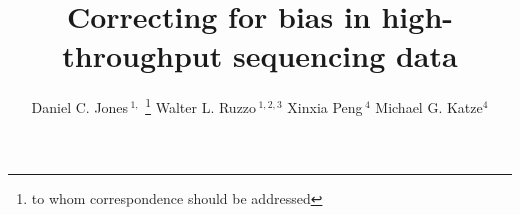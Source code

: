 \documentclass{bioinfo}
\begin{document}

\title{Correcting for bias in high-throughput sequencing data}
\author[Jones \textit{et~al}]
{Daniel C. Jones\,$^{1,}$
\footnote{to whom correspondence should be addressed}\hspace{0.5em}
Walter L. Ruzzo\,$^{1,2,3}$
Xinxia Peng\,$^{4}$
Michael G. Katze$^{4}$
}


\address{
$^{1}$Department of Computer Science and Engineering, University of
Washington, Seattle, WA 98195-2350, USA\\
$^{2}$Department of Genome Sciences, University of Washington, Seattle, Wa
98195-5065, USA\\
$^{3}$Fred Hutchinson Cancer Research Center, Seattle, WA 98109, USA\\
$^{4}$Department of Microbiology, University of Washington, Seattle, WA
98195-7242, USA}


\maketitle
\end{document}
